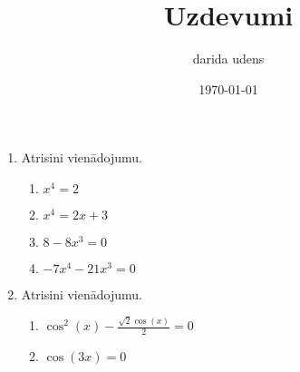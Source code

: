 \documentclass[12pt]{article}
\author{darida udens}
\date{\today}
\title{Uzdevumi}
\begin{document}
    \maketitle
    \begin{enumerate}
        \item Atrisini vienādojumu.
    \begin{enumerate}
        \item $x^{4} = 2$
        \item $x^{4} = 2 x + 3$
        \item $8 - 8 x^{3} = 0$
        \item $- 7 x^{4} - 21 x^{3} = 0$
    \end{enumerate}
        \item Atrisini vienādojumu.
    \begin{enumerate}
        \item $\cos^{2}{\left(x \right)} - \frac{\sqrt{2} \cos{\left(x \right)}}{2} = 0$
        \item $\cos{\left(3 x \right)} = 0$
    \end{enumerate}

	\end{enumerate}
\end{document}
